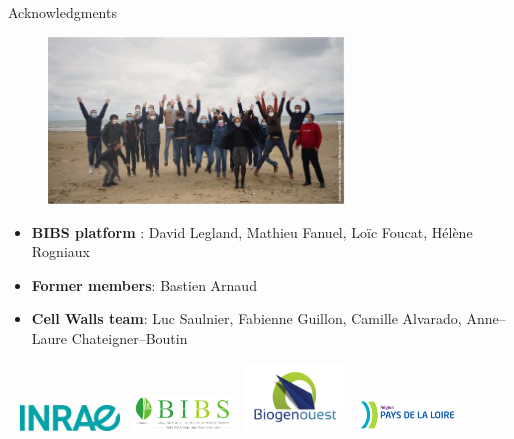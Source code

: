 \documentclass[10pt]{beamer}
\begin{document}
\section{}
\begin{frame}[plain]{Acknowledgments}
  \begin{figure}[ht]
      \centering
      \includegraphics[width=0.7\textwidth]{fig/photoequipe}
    \end{figure}
    
    {\scriptsize
  \begin{itemize}
  \item \textbf{BIBS platform} : David Legland, Mathieu Fanuel, Loïc Foucat, Hélène Rogniaux
  \item \textbf{Former members}: Bastien Arnaud
  \item \textbf{Cell Walls team}: Luc Saulnier, Fabienne Guillon, Camille Alvarado, Anne--Laure Chateigner--Boutin
  \end{itemize}
}
\vspace{-0.7cm}
  \hspace*{0.01\textwidth}~%
  \includegraphics[width=0.2\textwidth]{fig/logo-inrae}\hspace*{0.075\textwidth}~%
  \includegraphics[width=0.2\textwidth]{fig/logo-bibs.png}\hspace*{0.075\textwidth}~%
  \includegraphics[width=0.2\textwidth]{fig/logo-biogenouest}\hspace*{0.075\textwidth}~%
  \includegraphics[width=0.2\textwidth]{fig/logo-region}\hspace*{0.01\textwidth}~%

\end{frame}
\end{document}
